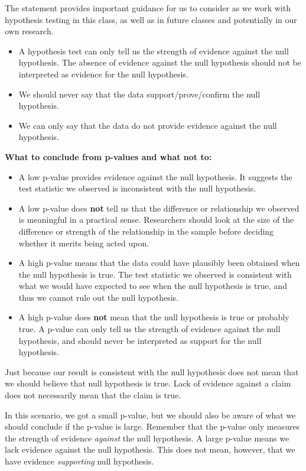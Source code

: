 \documentclass[
  letterpaper,
  DIV=11,
  numbers=noendperiod]{scrreprt}
\begin{document}
The statement provides important guidance for us to consider as we work
with hypothesis testing in this class, as well as in future classes and
potentially in our own research.

\begin{itemize}
\item
  A hypothesis test can only tell us the strength of evidence against
  the null hypothesis. The absence of evidence against the null
  hypothesis should not be interpreted as evidence for the null
  hypothesis.
\item
  We should never say that the data support/prove/confirm the null
  hypothesis.
\item
  We can only say that the data do not provide evidence against the null
  hypothesis.
\end{itemize}

\textbf{What to conclude from p-values and what not to:}

\begin{itemize}
\item
  A low p-value provides evidence against the null hypothesis. It
  suggests the test statistic we observed is inconsistent with the null
  hypothesis.
\item
  A low p-value does \textbf{not} tell us that the difference or
  relationship we observed is meaningful in a practical sense.
  Researchers should look at the size of the difference or strength of
  the relationship in the sample before deciding whether it merits being
  acted upon.
\item
  A high p-value means that the data could have plausibly been obtained
  when the null hypothesis is true. The test statistic we observed is
  consistent with what we would have expected to see when the null
  hypothesis is true, and thus we cannot rule out the null hypothesis.
\item
  A high p-value does \textbf{not} mean that the null hypothesis is true
  or probably true. A p-value can only tell us the strength of evidence
  against the null hypothesis, and should never be interpreted as
  support for the null hypothesis.
\end{itemize}

Just because our result is consistent with the null hypothesis does not
mean that we should believe that null hypothesis is true. Lack of
evidence against a claim does not necessarily mean that the claim is
true.

In this scenario, we got a small p-value, but we should also be aware of
what we should conclude if the p-value is large. Remember that the
p-value only measures the strength of evidence \emph{against} the null
hypothesis. A large p-value means we lack evidence against the null
hypothesis. This does not mean, however, that we have evidence
\emph{supporting} null hypothesis.
\end{document}
